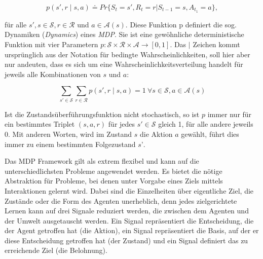 \[p(s',r \mid s,a) \doteq Pr\{S_t=s',R_t=r|S_{t-1}=s,A_{t_1}=a\},\]

für alle $s', s \in \mathcal{S}, r \in \mathcal{R}$ und $a \in \mathcal{A}(s)$. Diese Funktion p definiert die sog. Dynamiken (\textit{Dynamics}) eines \textit{MDP}. Sie ist eine gewöhnliche deterministische Funktion mit vier Parametern $p: \mathcal{S} \times \mathcal{R} \times \mathcal{A} \rightarrow [0,1]$. Das \glqq$\mid$\grqq{} Zeichen kommt ursprünglich aus der Notation für bedingte Wahrscheinlichkeiten, soll hier aber nur andeuten, dass es sich um eine Wahrscheinlichkeitsverteilung handelt für jeweils alle Kombinationen von $s$ und $a$:

\[ \sum_{s' \in \mathcal{S}} \sum_{r \in \mathcal{R}} p(s', r \mid s,a) = 1 \ \forall s \in \mathcal{S}, a \in \mathcal{A}(s)\]

Ist die Zustandsüberführungsfunktion nicht stochastisch, so ist $p$ immer nur für ein bestimmtes Triplet $(s,a,r)$ für jedes $s' \in \mathcal{S}$ gleich 1, für alle andere jeweils 0. Mit anderen Worten, wird im Zustand $s$ die Aktion $a$ gewählt, führt dies immer zu einem bestimmten Folgezustand $s’$. 
\par 

Das MDP Framework gilt als extrem flexibel und kann auf die unterschiedlichsten Probleme angewendet werden. Es bietet die nötige Abstraktion für Probleme, bei denen unter Vorgabe eines Ziels mittels Interaktionen gelernt wird. Dabei sind die Einzelheiten über eigentliche Ziel, die Zustände oder die Form des Agenten unerheblich, denn jedes zielgerichtete Lernen kann auf drei Signale reduziert werden, die zwischen dem Agenten und der Umwelt ausgetauscht werden. Ein Signal repräsentiert die Entscheidung, die der Agent getroffen hat (die Aktion), ein Signal repräsentiert die Basis, auf der er diese Entscheidung getroffen hat (der Zustand) und ein Signal definiert das zu erreichende Ziel (die Belohnung).

